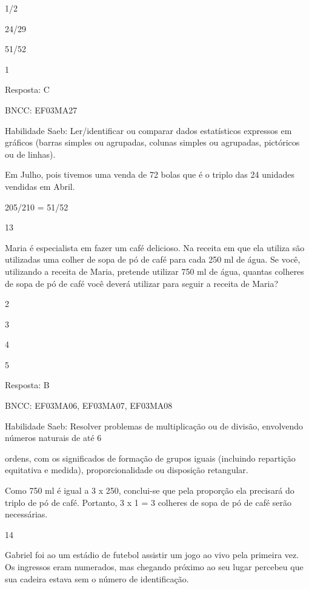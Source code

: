 \begin{escolha}
{\begin{escolha}
{\begin{escolha}
\item
  1/2
\item
  24/29
\item
  51/52
\item
  1
\end{escolha}

Resposta: C

BNCC: EF03MA27

Habilidade Saeb: Ler/identificar ou comparar dados estatísticos
expressos em gráficos (barras simples ou agrupadas, colunas simples ou
agrupadas, pictóricos ou de linhas).

Em Julho, pois tivemos uma venda de 72 bolas que é o triplo das 24
unidades vendidas em Abril.

205/210 = 51/52

\num{13}

Maria é especialista em fazer um café delicioso. Na receita em que ela
utiliza são utilizadas uma colher de sopa de pó de café para cada 250 ml
de água. Se você, utilizando a receita de Maria, pretende utilizar 750
ml de água, quantas colheres de sopa de pó de café você deverá utilizar
para seguir a receita de Maria?

\begin{escolha}
\item
  2
\item
  3
\item
  4
\item
  5
\end{escolha}

Resposta: B

BNCC: EF03MA06, EF03MA07, EF03MA08

Habilidade Saeb: Resolver problemas de multiplicação ou de divisão,
envolvendo números naturais de até 6

ordens, com os significados de formação de grupos iguais (incluindo
repartição equitativa e medida), proporcionalidade ou disposição
retangular.

Como 750 ml é igual a 3 x 250, conclui-se que pela proporção ela
precisará do triplo de pó de café. Portanto, 3 x 1 = 3 colheres de sopa
de pó de café serão necessárias.

\num{14}

Gabriel foi ao um estádio de futebol assistir um jogo ao vivo pela
primeira vez. Os ingressos eram numerados, mas chegando próximo ao seu
lugar percebeu que sua cadeira estava sem o número de identificação.

}
\end{escolha}}
\end{escolha}
